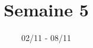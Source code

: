 \documentclass[11pt,a4paper]{article}
\begin{document}
\title{Semaine 5}
\author{}
\date{02/11 - 08/11 }

\maketitle
\end{document}
